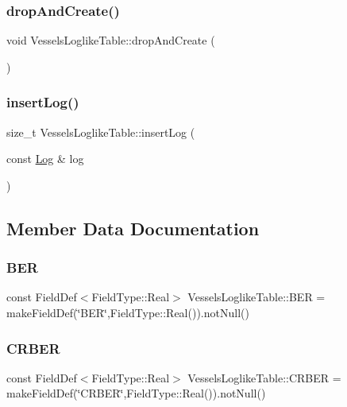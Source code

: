 \subsubsection{\texorpdfstring{dropAndCreate()}{dropAndCreate()}}
{\footnotesize\ttfamily void Vessels\+Loglike\+Table\+::drop\+And\+Create (\begin{DoxyParamCaption}{ }\end{DoxyParamCaption})}

\mbox{\label{class_vessels_loglike_table_a89d031eef1f09b54e64b1f09db0ce1d5}} 
\subsubsection{\texorpdfstring{insertLog()}{insertLog()}}
{\footnotesize\ttfamily size\+\_\+t Vessels\+Loglike\+Table\+::insert\+Log (\begin{DoxyParamCaption}\item[{const \mbox{\hyperlink{struct_vessels_loglike_table_1_1_log}{Log}} \&}]{log }\end{DoxyParamCaption})}



\subsection{Member Data Documentation}
\mbox{\label{class_vessels_loglike_table_ac8406547831ec1c8ca3adc2d1444b7b6}} 
\subsubsection{\texorpdfstring{BER}{BER}}
{\footnotesize\ttfamily const Field\+Def$<$Field\+Type\+::\+Real$>$ Vessels\+Loglike\+Table\+::\+B\+ER = make\+Field\+Def(\char`\"{}B\+ER\char`\"{},Field\+Type\+::\+Real()).not\+Null()}

\mbox{\label{class_vessels_loglike_table_aea98837a0ceb6daf142930950729b2b0}} 
\subsubsection{\texorpdfstring{CRBER}{CRBER}}
{\footnotesize\ttfamily const Field\+Def$<$Field\+Type\+::\+Real$>$ Vessels\+Loglike\+Table\+::\+C\+R\+B\+ER = make\+Field\+Def(\char`\"{}C\+R\+B\+ER\char`\"{},Field\+Type\+::\+Real()).not\+Null()}


